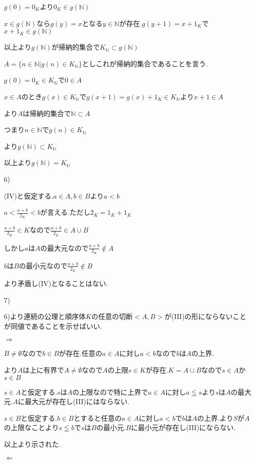 \documentclass{jsarticle}
\begin{document}
$g(0)=0_K$より$0_K\in g(\mathbb{N})$

$x\in g(\mathbb{N})$なら$g(y) = x$となる$y\in\mathbb{N}$が存在.$g(y+1)=x+1_K$で$x+1_K\in g(\mathbb{N})$

以上より$g(\mathbb{N})$が帰納的集合で$K_{\mathbb{N}}\subset g(\mathbb{N})$

$A=\{n\in \mathbb{N}|g(n)\in K_{\mathbb{N}}\}$としこれが帰納的集合であることを言う.

$g(0)=0_K\in K_{\mathbb{N}}$で$0\in A$

$x\in A$のとき$g(x)\in K_{\mathbb{N}}$で$g(x+1)=g(x)+1_K\in K_{\mathbb{N}}$より$x+1\in A$

より$A$は帰納的集合で$\mathbb{N}\subset A$

つまり$n\in\mathbb{N}$で$g(n)\in K_{\mathbb{N}}$

より$g(\mathbb{N}) \subset K_{\mathbb{N}}$

以上より$g(\mathbb{N}) = K_{\mathbb{N}}$

6)

(IV)と仮定する.$a\in A,b\in B$より$a<b$

$a < \frac{a+b}{2_K} < b$が言える.ただし$2_K=1_K+1_K$

$\frac{a+b}{2_K}\in K$なので$\frac{a+b}{2_K}\in A \cup B$

しかし$a$は$A$の最大元なので$\frac{a+b}{2_K}\notin A$

$b$は$B$の最小元なので$\frac{a+b}{2_K}\notin B$

より矛盾し(IV)となることはない.

7)

6)より連続の公理と順序体$K$の任意の切断$<A,B>$が(III)の形にならないことが同値であることを示せばいい.

$\Rightarrow$

$B\neq \emptyset$なので$b\in B$が存在.任意の$a\in A$に対し$a < b$なので$b$は$A$の上界.

より$A$は上に有界で$A\neq \emptyset$なので$A$の上限$s\in K$が存在.$K=A\cup B$なので$s\in A$か$s\in B$

$s \in A$と仮定する.$s$は$A$の上限なので特に上界で$a\in A$に対し$a\leqq s$より$s$は$A$の最大元.$A$に最大元が存在し(III)にはならない.

$s\in B$と仮定する.$b\in B$とすると任意の$a\in A$に対し$a< b$で$b$は$A$の上界.より$S$が$A$の上限なことより$s\leqq b$で$s$は$B$の最小元.$B$に最小元が存在し(III)にならない.

以上より示された.

$\Leftarrow$
\end{document}
